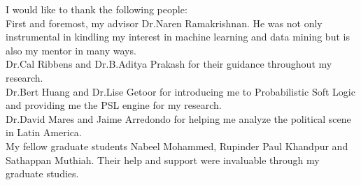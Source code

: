 \documentclass[12pt]{report}
\begin{document}
\vspace*{\fill}

I would like to thank the following people:\\
First and foremost, my advisor Dr.Naren Ramakrishnan. He was not only instrumental in kindling my interest in machine learning and data mining but is also my mentor in many ways.\\
Dr.Cal Ribbens and Dr.B.Aditya Prakash for their guidance throughout my research.\\
Dr.Bert Huang and Dr.Lise Getoor for introducing me to Probabilistic Soft Logic and providing me the PSL engine for my research.\\
Dr.David Mares and Jaime Arredondo for helping me analyze the political scene in Latin America.\\
My fellow graduate students Nabeel Mohammed, Rupinder Paul Khandpur and Sathappan Muthiah. Their help and support were invaluable through my graduate studies.

\vspace{\fill}

\tableofcontents
\pagebreak

\listoffigures
\pagebreak

\listoftables
\pagebreak

\pagestyle{myheadings}







\cleardoublepage



\end{document}
